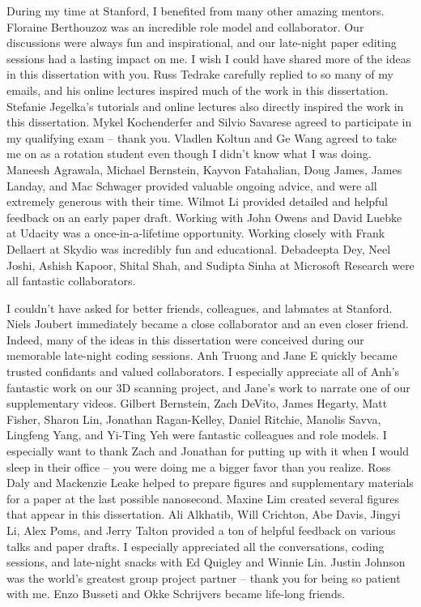 During my time at Stanford, I benefited from many other amazing mentors.
Floraine Berthouzoz was an incredible role model and collaborator.
Our discussions were always fun and inspirational, and our late-night paper editing sessions had a lasting impact on me.
I wish I could have shared more of the ideas in this dissertation with you.
Russ Tedrake carefully replied to so many of my emails, and his online lectures inspired much of the work in this dissertation.
Stefanie Jegelka's tutorials and online lectures also directly inspired the work in this dissertation.
Mykel Kochenderfer and Silvio Savarese agreed to participate in my qualifying exam -- thank you.
Vladlen Koltun and Ge Wang agreed to take me on as a rotation student even though I didn't know what I was doing.
Maneesh Agrawala, Michael Bernstein, Kayvon Fatahalian, Doug James, James Landay, and Mac Schwager provided valuable ongoing advice, and were all extremely generous with their time.
Wilmot Li provided detailed and helpful feedback on an early paper draft.
Working with John Owens and David Luebke at Udacity was a once-in-a-lifetime opportunity.
Working closely with Frank Dellaert at Skydio was incredibly fun and educational.
Debadeepta Dey, Neel Joshi, Ashish Kapoor, Shital Shah, and Sudipta Sinha at Microsoft Research were all fantastic collaborators.

I couldn't have asked for better friends, colleagues, and labmates at Stanford.
Niels Joubert immediately became a close collaborator and an even closer friend.
Indeed, many of the ideas in this dissertation were conceived during our memorable late-night coding sessions.
Anh Truong and Jane E quickly became trusted confidants and valued collaborators.
I especially appreciate all of Anh's fantastic work on our 3D scanning project, and Jane's work to narrate one of our supplementary videos.
Gilbert Bernstein, Zach DeVito, James Hegarty, Matt Fisher, Sharon Lin, Jonathan Ragan-Kelley, Daniel Ritchie, Manolis Savva, Lingfeng Yang, and Yi-Ting Yeh were fantastic colleagues and role models.
I especially want to thank Zach and Jonathan for putting up with it when I would sleep in their office -- you were doing me a bigger favor than you realize.
Ross Daly and Mackenzie Leake helped to prepare figures and supplementary materials for a paper at the last possible nanosecond.
Maxine Lim created several figures that appear in this dissertation.
Ali Alkhatib, Will Crichton, Abe Davis, Jingyi Li, Alex Poms, and Jerry Talton provided a ton of helpful feedback on various talks and paper drafts.
I especially appreciated all the conversations, coding sessions, and late-night snacks with Ed Quigley and Winnie Lin.
Justin Johnson was the world's greatest group project partner -- thank you for being so patient with me.
Enzo Busseti and Okke Schrijvers became life-long friends.

